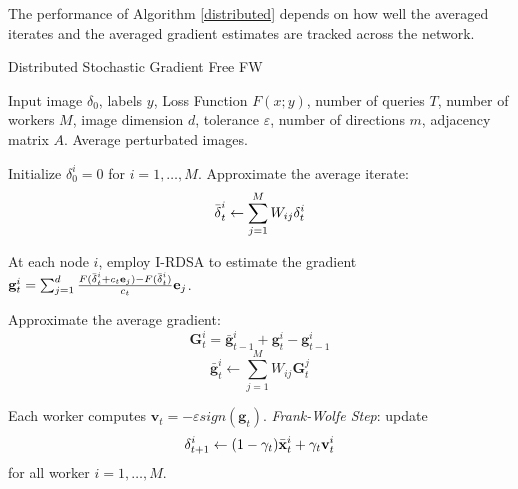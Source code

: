 The performance of Algorithm \ref{distributed} depends on how well the averaged iterates and the averaged gradient estimates are tracked across the network.
\begin{algorithm}
	\caption{Distributed Stochastic Gradient Free FW}\label{distributed}
	\begin{algorithmic}[1]
		\Require Input image \boldmath$\delta_0$, labels $y$, Loss Function $F(x;y)$, number of queries $T$, number of workers $M$, image dimension $d$, tolerance $\varepsilon$, number of directions $m$, adjacency matrix $A$.
		\Ensure Average perturbated images.
		
		\State Initialize \boldmath$\delta_0^i = \text{0}$ for $i=1,\dots, M$.
		\State Approximate the average iterate: \newline
		\[\bar{\text{\boldmath}\delta}_t^i \leftarrow \sum_{j=1}^{M} W_{ij}\text{\boldmath}\delta_t^i\]
		
		\State At each node $i$, employ I-RDSA to estimate the gradient 
		$\textbf{g}_t^i = \sum_{j=1}^{d} \frac{F(\bar{\text{\boldmath}\delta}_t^i + c_t\textbf{e}_j) - F(\bar{\text{\boldmath}\delta}_t^i)}{c_t}\textbf{e}_j$.
		
		\State Approximate the average gradient:
		\[ \textbf{G}_t^i = \bar{\textbf{g}}_{t-1}^i + \textbf{g}_t^i - \textbf{g}_{t-1}^i \]
		\[ \bar{\textbf{g}}_t^i \leftarrow \sum_{j=1}^{M} W_{ij}\textbf{G}_t^j  \]
		
		\State Each worker computes $\textbf{v}_t = - \varepsilon sign(\textbf{g}_t)$.
		\State \textit{Frank-Wolfe Step}: update
		\[\text{\boldmath}\delta_{t+1}^i \leftarrow (1-\gamma_t)\bar{\textbf{x}}_t^i + \gamma_t\textbf{v}_t^i\]
		for all worker $i=1, \dots, M$.
		\EndFor
		
	\end{algorithmic}
\end{algorithm}
